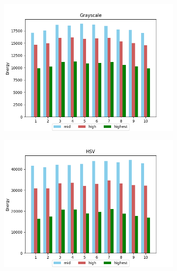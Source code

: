 \begin{figure}[H]
    \caption{\label{fig:appendix_coin_o_fft_results}Coin "o" letter FFT approach for (a) Grayscale, (b) HSV and (c) LAB images.}
    \centering
    \begin{subfigure}{.5\textwidth}
        \centering
        \includegraphics[scale=0.41]{images/appendix/fft/coin_o/grayscale.png}
        \caption{}
    \end{subfigure}%
    \begin{subfigure}{.5\textwidth}
         \centering
          \includegraphics[scale=0.41]{images/appendix/fft/coin_o/hsv.png}
          \caption{}
    \end{subfigure}
    \fautor
\end{figure}


